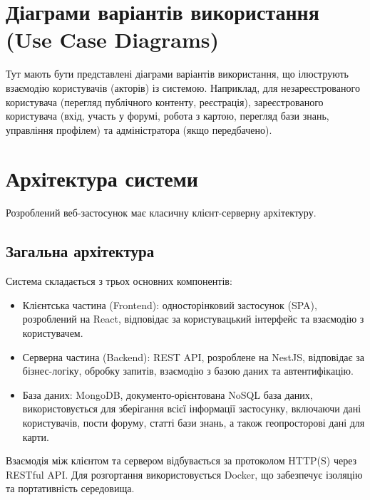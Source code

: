\section{Діаграми варіантів використання (Use Case Diagrams)}
\label{sec:use_cases}
Тут мають бути представлені діаграми варіантів використання, що ілюструють взаємодію користувачів (акторів) із системою. Наприклад, для незареєстрованого користувача (перегляд публічного контенту, реєстрація), зареєстрованого користувача (вхід, участь у форумі, робота з картою, перегляд бази знань, управління профілем) та адміністратора (якщо передбачено).

\section{Архітектура системи}
\label{sec:architecture}
Розроблений веб-застосунок має класичну клієнт-серверну архітектуру. 

\subsection{Загальна архітектура}
Система складається з трьох основних компонентів: 
\begin{itemize}
    \item Клієнтська частина (Frontend): односторінковий застосунок (SPA), розроблений на React, відповідає за користувацький інтерфейс та взаємодію з користувачем.
    \item Серверна частина (Backend): REST API, розроблене на NestJS, відповідає за бізнес-логіку, обробку запитів, взаємодію з базою даних та автентифікацію.
    \item База даних: MongoDB, документо-орієнтована NoSQL база даних, використовується для зберігання всієї інформації застосунку, включаючи дані користувачів, пости форуму, статті бази знань, а також геопросторові дані для карти.
\end{itemize}
Взаємодія між клієнтом та сервером відбувається за протоколом HTTP(S) через RESTful API. Для розгортання використовується Docker, що забезпечує ізоляцію та портативність середовища.

